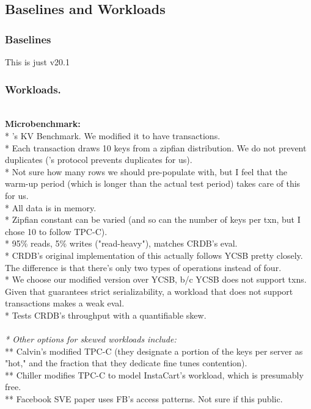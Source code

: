 \subsection{Baselines and Workloads}

\subsubsection{Baselines}
This is just \dsdb{} v20.1

\subsubsection{Workloads.}\\
\textbf{Microbenchmark:}\\
* \dsdb{}'s KV Benchmark. We modified it to have transactions.\\
* Each transaction draws 10 keys from a zipfian distribution. We do not
prevent duplicates (\dsdb{}'s protocol prevents duplicates for us).\\
* Not sure how many rows we should pre-populate with, but I feel that the warm-up period (which is longer than the actual test period) takes care of this for us.\\
* All data is in memory.\\
* Zipfian constant can be varied (and so can the number of keys per txn, but I chose 10 to follow TPC-C).\\
* 95\% reads, 5\% writes ("read-heavy"), matches CRDB's eval.\\
* CRDB's original implementation of this actually follows YCSB pretty closely. The difference is that there's only two types of operations instead of four.\\
* We choose our modified version over YCSB, b/c YCSB does not support txns. Given that \name{} guarantees strict serializability, a workload that does not support transactions makes a weak eval.\\
* Tests CRDB's throughput with a quantifiable skew.\\
\\
\textit{* Other options for skewed workloads include:}\\
** Calvin's modified TPC-C (they designate a portion of the keys per server as "hot," and the fraction that they dedicate fine tunes contention).\\
** Chiller modifies TPC-C to model InstaCart's workload, which is presumably free.\\
** Facebook SVE paper uses FB's access patterns. Not sure if this public.\\

